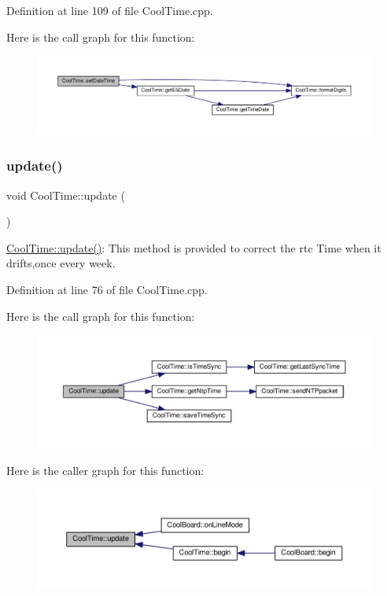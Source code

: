 Definition at line 109 of file Cool\+Time.\+cpp.

Here is the call graph for this function\+:
\nopagebreak
\begin{figure}[H]
\begin{center}
\leavevmode
\includegraphics[width=350pt]{class_cool_time_ab81ea7fdaace111aa01cc1ec84c6d297_cgraph}
\end{center}
\end{figure}
\mbox{\label{class_cool_time_aae601f795452cfa48d9fb337aed483a8}} 
\subsubsection{\texorpdfstring{update()}{update()}}
{\footnotesize\ttfamily void Cool\+Time\+::update (\begin{DoxyParamCaption}{ }\end{DoxyParamCaption})}

\hyperlink{class_cool_time_aae601f795452cfa48d9fb337aed483a8}{Cool\+Time\+::update()}\+: This method is provided to correct the rtc Time when it drifts,once every week. 

Definition at line 76 of file Cool\+Time.\+cpp.

Here is the call graph for this function\+:
\nopagebreak
\begin{figure}[H]
\begin{center}
\leavevmode
\includegraphics[width=350pt]{class_cool_time_aae601f795452cfa48d9fb337aed483a8_cgraph}
\end{center}
\end{figure}
Here is the caller graph for this function\+:
\nopagebreak
\begin{figure}[H]
\begin{center}
\leavevmode
\includegraphics[width=350pt]{class_cool_time_aae601f795452cfa48d9fb337aed483a8_icgraph}
\end{center}
\end{figure}


